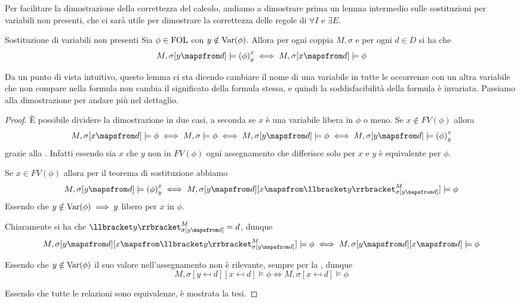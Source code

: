 Per facilitare la dimostrazione della correttezza del calcolo, andiamo a dimostrare prima un lemma intermedio sulle sostituzioni per variabili non presenti, che ci sarà utile per dimostrare la correttezza delle regole di \(\forall I\) e \(\exists E\).

\begin{lemma}[namedlabel={lem:subs_in_non_present_vars}{Sostituzione di variabili non presenti}]{Sostituzione di variabili non presenti}
  Sia \(\phi \in \FOL\) con \(y \notin \operatorname{Var}(\phi)\). Allora per ogni coppia \(M,\sigma\) e per ogni \(d \in D\) si ha che
  \[M,\sigma[y\mapsfrom d] \models \subs{\phi}{x}{y} \iff M,\sigma[x\mapsfrom d] \models\phi\]
\end{lemma}

Da un punto di vista intuitivo, questo lemma ci sta dicendo cambiare il nome di una variabile in tutte le occorrenze con un altra variabile che non compare nella formula non cambia il significato della formula stessa, e quindi la soddisfacibilità della formula è invariata. Passiamo alla dimostrazione per andare più nel dettaglio.

\begin{proof}
  È possibile dividere la dimostrazione in due casi, a seconda se \(x\) è una variabile libera in \(\phi\) o meno.
  Se \(x \notin FV(\phi)\) allora
  \[M,\sigma[x\mapsfrom d] \models \phi \iff M,\sigma\models \phi \iff M,\sigma[y\mapsfrom d]\models \phi \iff M,\sigma[y\mapsfrom d] \models \subs{\phi}{x}{y}\]
  grazie alla . Infatti essendo sia \(x\) che \(y\) non in \(FV(\phi)\) ogni assegnamento che differisce solo per \(x\) e \(y\) è equivalente per \(\phi\).

  Se \(x \in FV(\phi)\) allora per il teorema di sostituzione abbiamo
  \[M,\sigma[y\mapsfrom d] \models \subs{\phi}{x}{y} \iff M,\sigma[y\mapsfrom d][x\mapsfrom \den{y}[M][\sigma[y\mapsfrom d]]] \models \phi\]
  Essendo che \(y\notin \operatorname{Var}(\phi)\implies y\) libero per \(x\) in \(\phi\).

  Chiaramente si ha che \(\den{y}[M][\sigma[y\mapsfrom d]] = d\), dunque
  \[M,\sigma[y\mapsfrom d][x\mapsfrom \den{y}[M][\sigma[y\mapsfrom d]]] \models \phi \iff M,\sigma[y\mapsfrom d][x\mapsfrom d] \models \phi\]

  Essendo che \(y\notin \operatorname{Var}(\phi)\) il suo valore nell'assegnamento non è rilevante, sempre per la , dunque
  \[M,\sigma[y\mapsfrom d][x\mapsfrom d] \models \phi \iff M,\sigma[x\mapsfrom d] \models \phi\]

  Essendo che tutte le relazioni sono equivalenze, è mostrata la tesi.
\end{proof}

